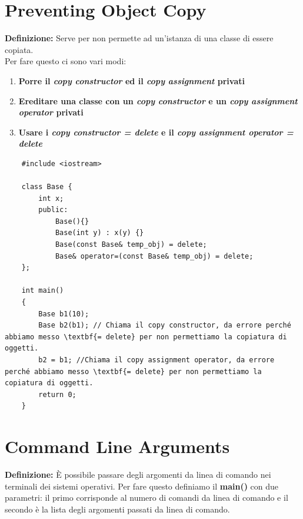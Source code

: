 \section{Preventing Object Copy} %

\textsf{\small \textbf{Definizione: } Serve per non permette ad un'istanza di una classe di essere copiata.} \\

\textsf{\small Per fare questo ci sono vari modi: } \\

\begin{enumerate}
	\item \textsf{\small \textbf{Porre il \emph{copy constructor} ed il \emph{copy assignment} privati} }
	\item \textsf{\small \textbf{Ereditare una classe con un \emph{copy constructor} e un \emph{copy assignment operator} privati} }
	\item \textsf{\small \textbf{Usare i \emph{copy constructor = delete} e il \emph{copy assignment operator = delete}}}
\end{enumerate}

\begin{lstlisting}
	#include <iostream>
	
	class Base {
		int x;
		public:
			Base(){}
			Base(int y) : x(y) {}
			Base(const Base& temp_obj) = delete;
			Base& operator=(const Base& temp_obj) = delete;
	};
	
	int main()
	{
		Base b1(10);
		Base b2(b1); // Chiama il copy constructor, da errore perché abbiamo messo \textbf{= delete} per non permettiamo la copiatura di oggetti.
		b2 = b1; //Chiama il copy assignment operator, da errore perché abbiamo messo \textbf{= delete} per non permettiamo la copiatura di oggetti.
		return 0;
	}
\end{lstlisting}


\newpage

\section{Command Line Arguments} %

\textsf{\small \textbf{Definizione: } È possibile passare degli argomenti da linea di comando nei terminali dei sistemi operativi. Per fare questo definiamo il \textbf{main()} con due parametri: il primo corrisponde al numero di comandi da linea di comando e il secondo è la lista degli argomenti passati da linea di comando.} \\

